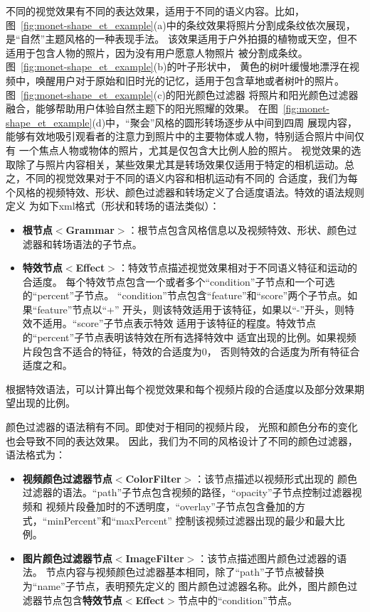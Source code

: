 \documentclass[doctor]{ustcthesis}
\begin{document}
不同的视觉效果有不同的表达效果，适用于不同的语义内容。比如，
图~\ref{fig:monet-shape_et_example}(a)中的条纹效果将照片分割成条纹依次展现，是``自然''主题风格的一种表现手法。
该效果适用于户外拍摄的植物或天空，但不适用于包含人物的照片，因为没有用户愿意人物照片
被分割成条纹。图~\ref{fig:monet-shape_et_example}(b)的叶子形状中，
黄色的树叶缓慢地漂浮在视频中，唤醒用户对于原始和旧时光的记忆，适用于包含草地或者树叶的照片。
图~\ref{fig:monet-shape_et_example}(c)的阳光颜色过滤器
将照片和阳光颜色过滤器融合，能够帮助用户体验自然主题下的阳光照耀的效果。
在图~\ref{fig:monet-shape_et_example}(d)中，``聚会''风格的圆形转场逐步从中间到四周
展现内容，能够有效地吸引观看者的注意力到照片中的主要物体或人物，特别适合照片中间仅有
一个焦点人物或物体的照片，尤其是仅包含大比例人脸的照片。
视觉效果的选取除了与照片内容相关，某些效果尤其是转场效果仅适用于特定的相机运动。总之，不同的视觉效果对于不同的语义内容和相机运动有不同的
合适度，我们为每个风格的视频特效、形状、颜色过滤器和转场定义了合适度语法。特效的语法规则定义
为如下xml格式（形状和转场的语法类似）：
\begin{itemize}\setlength{\itemsep}{0pt}
    \item \textbf{根节点$<$Grammar$>$}：根节点包含风格信息以及视频特效、形状、颜色过滤器和转场语法的子节点。
    \item \textbf{特效节点$<$Effect$>$}：特效节点描述视觉效果相对于不同语义特征和运动的合适度。
        每个特效节点包含一个或者多个``condition''子节点和一个可选的``percent''子节点。
        ``condition''节点包含``feature''和``score''两个子节点。如果``feature''节点以``+''
        开头，则该特效适用于该特征，如果以``-''开头，则特效不适用。``score''子节点表示特效
        适用于该特征的程度。特效节点的``percent''子节点表明该特效在所有选择特效中
        适宜出现的比例。如果视频片段包含不适合的特征，特效的合适度为$0$，
        否则特效的合适度为所有特征合适度之和。
\end{itemize}

根据特效语法，可以计算出每个视觉效果和每个视频片段的合适度以及部分效果期望出现的比例。

颜色过滤器的语法稍有不同。即使对于相同的视频片段，
光照和颜色分布的变化也会导致不同的表达效果。
因此，我们为不同的风格设计了不同的颜色过滤器，语法格式为：
\begin{itemize}\setlength{\itemsep}{0pt}
    \item \textbf{视频颜色过滤器节点$<$ColorFilter$>$}：该节点描述以视频形式出现的
        颜色过滤器的语法。``path''子节点包含视频的路径，``opacity''子节点控制过滤器视频和
        视频片段叠加时的不透明度，``overlay''子节点包含叠加的方式，``minPercent''和``maxPercent''
        控制该视频过滤器出现的最少和最大比例。
    \item \textbf{图片颜色过滤器节点$<$ImageFilter$>$}：该节点描述图片颜色过滤器的语法。
        节点内容与视频颜色过滤器基本相同，除了``path''子节点被替换为``name''子节点，表明预先定义的
        图片颜色过滤器名称。此外，图片颜色过滤器节点包含\textbf{特效节点$<$Effect$>$}节点中的``condition''节点。
\end{itemize}
\end{document}

